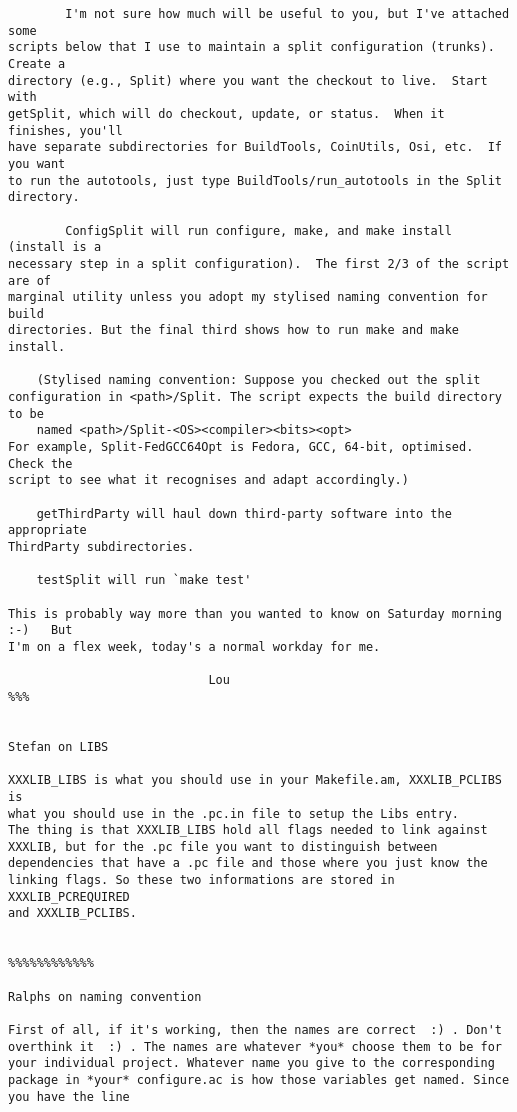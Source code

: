 \begin{verbatim}
        I'm not sure how much will be useful to you, but I've attached some
scripts below that I use to maintain a split configuration (trunks).  Create a
directory (e.g., Split) where you want the checkout to live.  Start with
getSplit, which will do checkout, update, or status.  When it finishes, you'll
have separate subdirectories for BuildTools, CoinUtils, Osi, etc.  If you want
to run the autotools, just type BuildTools/run_autotools in the Split directory.

        ConfigSplit will run configure, make, and make install (install is a
necessary step in a split configuration).  The first 2/3 of the script are of
marginal utility unless you adopt my stylised naming convention for build
directories. But the final third shows how to run make and make install.

	(Stylised naming convention: Suppose you checked out the split 
configuration in <path>/Split. The script expects the build directory to be
	named <path>/Split-<OS><compiler><bits><opt>
For example, Split-FedGCC64Opt is Fedora, GCC, 64-bit, optimised. Check the 
script to see what it recognises and adapt accordingly.)

	getThirdParty will haul down third-party software into the appropriate
ThirdParty subdirectories.

	testSplit will run `make test'
	
This is probably way more than you wanted to know on Saturday morning   :-)   But 
I'm on a flex week, today's a normal workday for me.
	
							Lou
%%% 


Stefan on LIBS

XXXLIB_LIBS is what you should use in your Makefile.am, XXXLIB_PCLIBS is
what you should use in the .pc.in file to setup the Libs entry.
The thing is that XXXLIB_LIBS hold all flags needed to link against
XXXLIB, but for the .pc file you want to distinguish between
dependencies that have a .pc file and those where you just know the
linking flags. So these two informations are stored in XXXLIB_PCREQUIRED
and XXXLIB_PCLIBS.


%%%%%%%%%%%%

Ralphs on naming convention

First of all, if it's working, then the names are correct  :) . Don't
overthink it  :) . The names are whatever *you* choose them to be for
your individual project. Whatever name you give to the corresponding
package in *your* configure.ac is how those variables get named. Since
you have the line


\end{verbatim}
